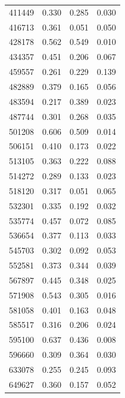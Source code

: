 \documentclass[fleqn,usenatbib]{mnras}
\begin{document}
\begin{table}
\begin{tabular}{cccc}
411449                         & 0.330    & 0.285         & 0.030          \\
416713                         & 0.361    & 0.051         & 0.050          \\
428178                         & 0.562    & 0.549         & 0.010          \\
434357                         & 0.451    & 0.206         & 0.067          \\
459557                         & 0.261    & 0.229         & 0.139          \\
482889                         & 0.379    & 0.165         & 0.056          \\
483594                         & 0.217    & 0.389         & 0.023          \\
487744                         & 0.301    & 0.268         & 0.035          \\
501208                         & 0.606    & 0.509         & 0.014          \\
506151                         & 0.410    & 0.173         & 0.022          \\
513105                         & 0.363    & 0.222         & 0.088          \\
514272                         & 0.289    & 0.133         & 0.023          \\
518120                         & 0.317    & 0.051         & 0.065          \\
532301                         & 0.335    & 0.192         & 0.032          \\
535774                         & 0.457    & 0.072         & 0.085          \\
536654                         & 0.377    & 0.113         & 0.033          \\
545703                         & 0.302    & 0.092         & 0.053          \\
552581                         & 0.373    & 0.344         & 0.039          \\
567897                         & 0.445    & 0.348         & 0.025          \\
571908                         & 0.543    & 0.305         & 0.016          \\
581058                         & 0.401    & 0.163         & 0.048          \\
585517                         & 0.316    & 0.206         & 0.024          \\
595100                         & 0.637    & 0.436         & 0.008          \\
596660                         & 0.309    & 0.364         & 0.030          \\
633078                         & 0.255    & 0.245         & 0.093          \\
649627                         & 0.360    & 0.157         & 0.052          \\ \hline
\end{tabular}
\end{table}
%
\end{document}
